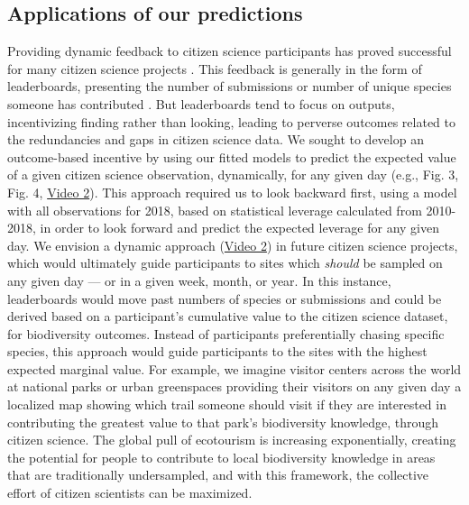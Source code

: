 \documentclass[9pt,twocolumn,twoside,lineno]{pnas-new}
\begin{document}
\subsection*{Applications of our predictions}
Providing dynamic feedback to citizen science participants has proved successful for many citizen science projects \cite{rowley2019frogid, wiggins2011conservation, xue2016avicaching}. This feedback is generally in the form of leaderboards, presenting the number of submissions or number of unique species someone has contributed \cite{wood2011ebird}. But leaderboards tend to focus on outputs, incentivizing finding rather than looking, leading to perverse outcomes related to the redundancies and gaps in citizen science data. We sought to develop an outcome-based incentive by using our fitted models to predict the expected value of a given citizen science observation, dynamically, for any given day (e.g., Fig. 3, Fig. 4, \href{https://github.com/coreytcallaghan/optimize_citizen_science_obs/blob/master/Figures/dynamic_map.gif}{Video 2}). This approach required us to look backward first, using a model with all observations for 2018, based on statistical leverage calculated from 2010-2018, in order to look forward and predict the expected leverage for any given day. We envision a dynamic approach (\href{https://github.com/coreytcallaghan/optimize_citizen_science_obs/blob/master/Figures/dynamic_map.gif}{Video 2}) in future citizen science projects, which would ultimately guide participants to sites which \textit{should} be sampled on any given day --- or in a given week, month, or year. In this instance, leaderboards would move past numbers of species or submissions and could be derived based on a participant's cumulative value to the citizen science dataset, for biodiversity outcomes. Instead of participants preferentially chasing specific species, this approach would guide participants to the sites with the highest expected marginal value. For example, we imagine visitor centers across the world at national parks or urban greenspaces providing their visitors on any given day a localized map showing which trail someone should visit if they are interested in contributing the greatest value to that park's biodiversity knowledge, through citizen science. The global pull of ecotourism \cite{sharpley2006ecotourism} is increasing exponentially, creating the potential for people to contribute to local biodiversity knowledge in areas that are traditionally undersampled, and with this framework, the collective effort of citizen scientists can be maximized.
\end{document}
